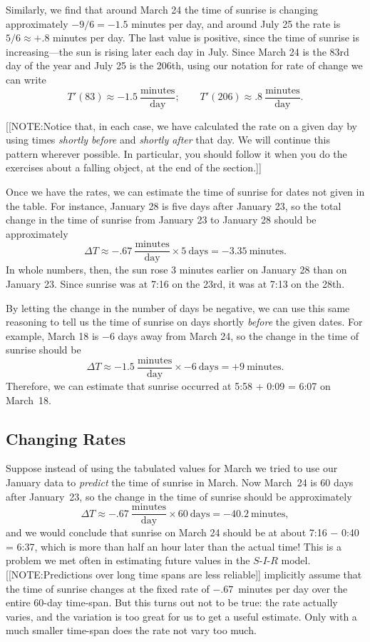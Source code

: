Similarly, we find that around March 24 the time of sunrise is
changing approximately $-9/6 = -1.5$ minutes per day, and around July
25 the rate is $5/6 \approx +.8$ minutes per day.  The last value is
positive, since the time of sunrise is increasing---the sun is rising
later each day in July.  Since March 24 is the 83rd day of the year
and July 25 is the 206th, using our notation for rate of change we can
write
\[
T'(83) \approx -1.5
		\ \frac{\mbox{minutes}}{\mbox{day}}; \qquad 
T'(206) \approx  .8 
		\ \frac{\mbox{minutes}}{\mbox{day}}.
\]



[[NOTE:Notice that, in each case, we have calculated the rate on a
  given day by using times {\em shortly before\/} and {\em shortly
    after\/} that day.  We will continue this pattern wherever
  possible.  In particular, you should follow it when you do the
  exercises about a falling object, at the end of the section.]]


Once we have the rates, we can estimate the time of sunrise for dates
not given in the table.  For instance, January 28 is five days after
January 23, so the total change in the time of sunrise from January 23
to January 28 should be approximately
\[
\Delta T \approx -.67 \ 
		\frac{\mbox{minutes}}{\mbox{day}} \times 5 
		\ \mbox{days} = -3.35 \ \mbox{minutes}.  
\]
In whole numbers, then, the sun rose 3 minutes earlier on January 28
than on January 23.  Since sunrise was at 7:16 on the 23rd, it was at
7:13 on the 28th.

By letting the change in the number of days be negative, we can use
this same reasoning to tell us the time of sunrise on days shortly
{\em before\/} the given dates.  For example, March 18 is $-6$ days
away from March 24, so the change in the time of sunrise should be
\[
\Delta T \approx -1.5 \ 
		\frac{\mbox{minutes}}{\mbox{day}} \times 
		-6 \ \mbox{days} = +9 \ \mbox{minutes}.
\]
Therefore, we can estimate that sunrise occurred at 5:58 + 0:09 = 6:07
on March~18.

\subsection{Changing Rates}
\label{subsec:changing-rates}

Suppose instead of using the tabulated values for March we tried to
use our January data to {\em predict\/} the time of sunrise in March.
Now March~24 is 60 days after January~23, so the change in the time of
sunrise should be approximately
\[
\Delta T \approx -.67 \ 
		\frac{\mbox{minutes}}{\mbox{day}} \times 
		60 \ \mbox{days} = -40.2 \ \mbox{minutes},
\]
and we would conclude that sunrise on March 24 should be at about 7:16
$-$ 0:40 = 6:37, which is more than half an hour later than the actual
time!  This is a problem we met often in estimating future values in
the $S$-$I$-$R$ model.  
[[NOTE:Predictions over  long time spans  are less reliable]] 
implicitly assume that the time of sunrise changes at the fixed rate
of $-.67$~minutes per day over the entire 60-day time-span.  But this
turns out not to be true: the rate actually varies, and the variation
is too great for us to get a useful estimate.  Only with a much
smaller time-span does the rate not vary too much.

